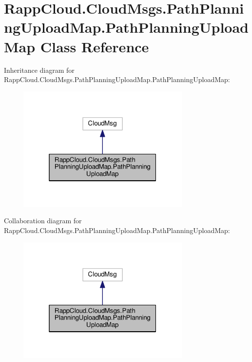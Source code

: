 \hypertarget{classRappCloud_1_1CloudMsgs_1_1PathPlanningUploadMap_1_1PathPlanningUploadMap}{\section{Rapp\-Cloud.\-Cloud\-Msgs.\-Path\-Planning\-Upload\-Map.\-Path\-Planning\-Upload\-Map Class Reference}
\label{classRappCloud_1_1CloudMsgs_1_1PathPlanningUploadMap_1_1PathPlanningUploadMap}
}


Inheritance diagram for Rapp\-Cloud.\-Cloud\-Msgs.\-Path\-Planning\-Upload\-Map.\-Path\-Planning\-Upload\-Map\-:
\nopagebreak
\begin{figure}[H]
\begin{center}
\leavevmode
\includegraphics[width=244pt]{classRappCloud_1_1CloudMsgs_1_1PathPlanningUploadMap_1_1PathPlanningUploadMap__inherit__graph}
\end{center}
\end{figure}


Collaboration diagram for Rapp\-Cloud.\-Cloud\-Msgs.\-Path\-Planning\-Upload\-Map.\-Path\-Planning\-Upload\-Map\-:
\nopagebreak
\begin{figure}[H]
\begin{center}
\leavevmode
\includegraphics[width=244pt]{classRappCloud_1_1CloudMsgs_1_1PathPlanningUploadMap_1_1PathPlanningUploadMap__coll__graph}
\end{center}
\end{figure}
